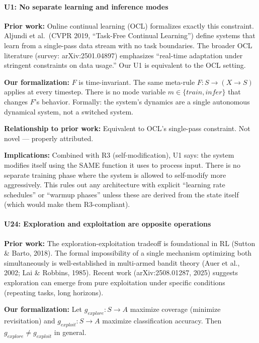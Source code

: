 \documentclass[
  11pt,
]{article}
\begin{document}
\paragraph{U1: No separate learning and inference
modes}\label{u1-no-separate-learning-and-inference-modes}

\textbf{Prior work:} Online continual learning (OCL) formalizes exactly
this constraint. Aljundi et al.~(CVPR 2019, ``Task-Free Continual
Learning'') define systems that learn from a single-pass data stream
with no task boundaries. The broader OCL literature (survey:
arXiv:2501.04897) emphasizes ``real-time adaptation under stringent
constraints on data usage.'' Our U1 is equivalent to the OCL setting.

\textbf{Our formalization:} \(F\) is time-invariant. The same meta-rule
\(F: S \to (X \to S)\) applies at every timestep. There is no mode
variable \(m \in \{train, infer\}\) that changes \(F\)'s behavior.
Formally: the system's dynamics are a single autonomous dynamical
system, not a switched system.

\textbf{Relationship to prior work:} Equivalent to OCL's single-pass
constraint. Not novel --- properly attributed.

\textbf{Implications:} Combined with R3 (self-modification), U1 says:
the system modifies itself using the SAME function it uses to process
input. There is no separate training phase where the system is allowed
to self-modify more aggressively. This rules out any architecture with
explicit ``learning rate schedules'' or ``warmup phases'' unless these
are derived from the state itself (which would make them R3-compliant).

\paragraph{U24: Exploration and exploitation are opposite
operations}\label{u24-exploration-and-exploitation-are-opposite-operations}

\textbf{Prior work:} The exploration-exploitation tradeoff is
foundational in RL (Sutton \& Barto, 2018). The formal impossibility of
a single mechanism optimizing both simultaneously is well-established in
multi-armed bandit theory (Auer et al., 2002; Lai \& Robbins, 1985).
Recent work (arXiv:2508.01287, 2025) suggests exploration can emerge
from pure exploitation under specific conditions (repeating tasks, long
horizons).

\textbf{Our formalization:} Let \(g_{explore}: S \to A\) maximize
coverage (minimize revisitation) and \(g_{exploit}: S \to A\) maximize
classification accuracy. Then \(g_{explore} \neq g_{exploit}\) in
general.
\end{document}
